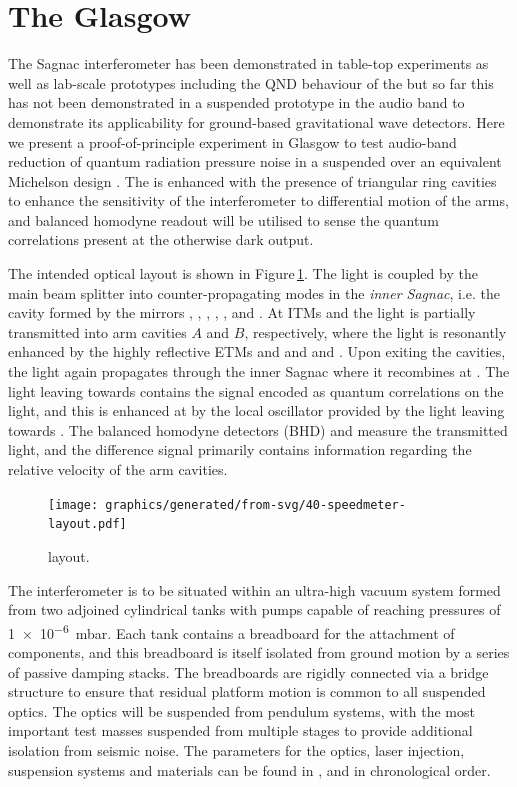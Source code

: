\section{The Glasgow \SSMEXPT{}}
The Sagnac interferometer has been demonstrated in table-top experiments \cite{Shaddock1998} as well as lab-scale prototypes \cite{Beyersdorf2002} including the \gls{QND} behaviour of the \SSM{} \cite{Eberle2010} but so far this has not been demonstrated in a suspended prototype in the audio band to demonstrate its applicability for ground-based gravitational wave detectors. Here we present a proof-of-principle experiment in Glasgow to test audio-band reduction of quantum radiation pressure noise in a suspended \SSM{} over an equivalent Michelson design \cite{Graef2014}. The \SSM{} is enhanced with the presence of triangular ring cavities to enhance the sensitivity of the interferometer to differential motion of the arms, and balanced homodyne readout will be utilised to sense the quantum correlations present at the otherwise dark output.

The intended optical layout is shown in Figure\,\ref{fig:ssm-layout}. The light is coupled by the main beam splitter \MSIX{} into counter-propagating modes in the \emph{inner Sagnac}, i.e. the cavity formed by the mirrors \MSIX{}, \MSEVEN{}, \MONEA{}, \MTEN{}, \MNINE{}, \MEIGHT{} and \MONEB{}. At \glspl{ITM} \MONEA{} and \MONEB{} the light is partially transmitted into arm cavities $A$ and $B$, respectively, where the light is resonantly enhanced by the highly reflective \glspl{ETM} \MTWOA{} and \MTHREEA{} and \MTWOB{} and \MTHREEB{}. Upon exiting the cavities, the light again propagates through the inner Sagnac where it recombines at \MSIX{}. The light leaving \MSIX{} towards \MFOURTEEN{} contains the signal encoded as quantum correlations on the light, and this is enhanced at \MSIXTEEN{} by the local oscillator provided by the light leaving \MSIX{} towards \MTWELVE{}. The balanced homodyne detectors (\gls{BHD}) \HDA{} and \HDB{} measure the transmitted light, and the difference signal primarily contains information regarding the relative velocity of the arm cavities.

\begin{figure}
  \centering
  \texttt{[image: graphics/generated/from-svg/40-speedmeter-layout.pdf]}
  \caption[\SSMEXPT{} layout]{\label{fig:ssm-layout}\SSMEXPT{} layout.}
\end{figure}

The interferometer is to be situated within an ultra-high vacuum system formed from two adjoined cylindrical tanks with pumps capable of reaching pressures of \SI{1e-6}{\milli\bar}. Each tank contains a breadboard for the attachment of components, and this breadboard is itself isolated from ground motion by a series of passive damping stacks. The breadboards are rigidly connected via a bridge structure to ensure that residual platform motion is common to all suspended optics. The optics will be suspended from pendulum systems, with the most important test masses suspended from multiple stages to provide additional isolation from seismic noise. The parameters for the optics, laser injection, suspension systems and materials can be found in \cite{Graef2014}, \cite{Danilishin2015} and \cite{Leavey2016} in chronological order.

